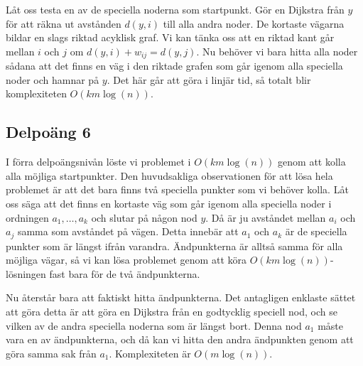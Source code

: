Låt oss testa en av de speciella noderna som startpunkt.
Gör en Dijkstra från $y$ för att räkna ut avstånden $d(y,i)$ till alla andra noder.
De kortaste vägarna bildar en slags riktad acyklisk graf.
Vi kan tänka oss att en riktad kant går mellan $i$ och $j$ om $d(y,i) + w_{ij} = d(y,j)$.
Nu behöver vi bara hitta alla noder sådana att det finns en väg i den riktade grafen som går igenom alla speciella noder och hamnar på $y$.
Det här går att göra i linjär tid, så totalt blir komplexiteten $O(km\log(n))$.

\subsection*{Delpoäng 6}

I förra delpoängsnivån löste vi problemet i $O(km\log(n))$ genom att kolla alla möjliga startpunkter.
Den huvudsakliga observationen för att lösa hela problemet är att det bara finns två speciella punkter som vi behöver kolla.
Låt oss säga att det finns en kortaste väg som går igenom alla speciella noder i ordningen $a_1, \dots, a_k$ och slutar på någon nod $y$.
Då är ju avståndet mellan $a_i$ och $a_j$ samma som avståndet på vägen.
Detta innebär att $a_1$ och $a_k$ är de speciella punkter som är längst ifrån varandra.
Ändpunkterna är alltså samma för alla möjliga vägar, så vi kan lösa problemet genom att köra $O(km\log(n))$-lösningen fast bara för de två ändpunkterna.

Nu återstår bara att faktiskt hitta ändpunkterna.
Det antagligen enklaste sättet att göra detta är att göra en Dijkstra från en godtycklig speciell nod, och se vilken av de andra speciella noderna som är längst bort.
Denna nod $a_1$ måste vara en av ändpunkterna, och då kan vi hitta den andra ändpunkten genom att göra samma sak från $a_1$.
Komplexiteten är $O(m\log(n))$.
